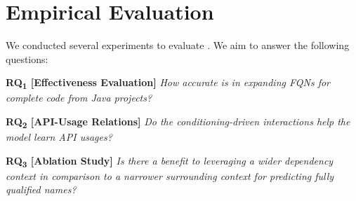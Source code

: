 \section{Empirical Evaluation}
\label{sec:evaluation}


We conducted several experiments to evaluate {\tool}. We aim to answer the following questions:

\vspace{2pt}
\noindent \textbf{RQ\textsubscript{1} 
  [Effectiveness Evaluation]} {\em How accurate is {\tool} in expanding FQNs for complete code from Java projects?}

\vspace{2pt}
\noindent \textbf{RQ\textsubscript{2}
[API-Usage Relations]} {\em Do the conditioning-driven interactions help the model learn API usages?}

\vspace{2pt}
\noindent \textbf{RQ\textsubscript{3} 
[Ablation Study]}  {\em Is there a benefit to leveraging a wider dependency context in comparison to a narrower surrounding context for predicting fully qualified names?}



%
